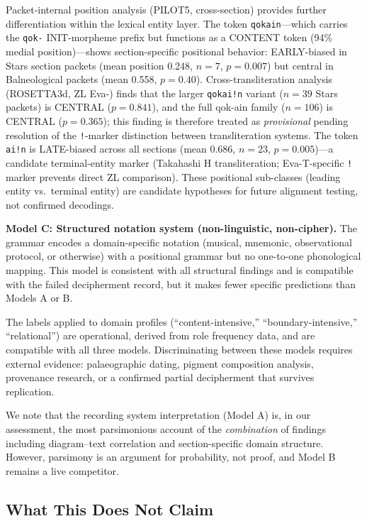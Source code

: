 \documentclass[11pt,a4paper,twocolumn]{article}
\begin{document}
Packet-internal position analysis (PILOT5, cross-section) provides further differentiation within the lexical entity layer. The token \texttt{qokain}---which carries the \texttt{qok-} INIT-morpheme prefix but functions as a CONTENT token (94\% medial position)---shows section-specific positional behavior: EARLY-biased in Stars section packets (mean position 0.248, $n = 7$, $p = 0.007$) but central in Balneological packets (mean 0.558, $p = 0.40$). Cross-transliteration analysis (ROSETTA3d, ZL Eva-) finds that the larger \texttt{qokai!n} variant ($n = 39$ Stars packets) is CENTRAL ($p = 0.841$), and the full qok-ain family ($n = 106$) is CENTRAL ($p = 0.365$); this finding is therefore treated as \textit{provisional} pending resolution of the \texttt{!}-marker distinction between transliteration systems. The token \texttt{ai!n} is LATE-biased across all sections (mean 0.686, $n = 23$, $p = 0.005$)---a candidate terminal-entity marker (Takahashi H transliteration; Eva-T-specific \texttt{!} marker prevents direct ZL comparison). These positional sub-classes (leading entity vs.\ terminal entity) are candidate hypotheses for future alignment testing, not confirmed decodings.

\textbf{Model C: Structured notation system (non-linguistic, non-cipher).} The grammar encodes a domain-specific notation (musical, mnemonic, observational protocol, or otherwise) with a positional grammar but no one-to-one phonological mapping. This model is consistent with all structural findings and is compatible with the failed decipherment record, but it makes fewer specific predictions than Models A or B.

The labels applied to domain profiles (``content-intensive,'' ``boundary-intensive,'' ``relational'') are operational, derived from role frequency data, and are compatible with all three models. Discriminating between these models requires external evidence: palaeographic dating, pigment composition analysis, provenance research, or a confirmed partial decipherment that survives replication.

We note that the recording system interpretation (Model A) is, in our assessment, the most parsimonious account of the \textit{combination} of findings including diagram--text correlation and section-specific domain structure. However, parsimony is an argument for probability, not proof, and Model B remains a live competitor.

\subsection{What This Does Not Claim}
\end{document}
